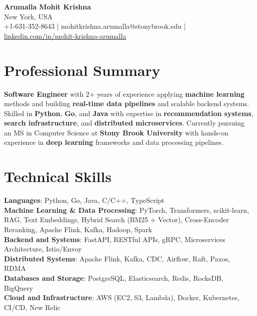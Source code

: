 \documentclass[letterpaper,11pt]{article}
\begin{document}
\begin{center}
  {\Large \textbf{Arumalla Mohit Krishna}} \\
  New York, USA \\
  +1-631-352-8643 \enspace | \enspace mohitkrishna.arumalla@stonybrook.edu \enspace | \enspace \href{https://www.linkedin.com/in/mohit-krishna-arumalla}{linkedin.com/in/mohit-krishna-arumalla}
\end{center}

\section{Professional Summary}
  \begin{itemize}[leftmargin=0.15in, label={}]
    \small{\item{
     \textbf{Software Engineer} with 2+ years of experience applying \textbf{machine learning} methods and building \textbf{real-time data pipelines} and scalable backend systems. Skilled in \textbf{Python}, \textbf{Go}, and \textbf{Java} with expertise in \textbf{recommendation systems}, \textbf{search infrastructure}, and \textbf{distributed microservices}. Currently pursuing an MS in Computer Science at \textbf{Stony Brook University} with hands-on experience in \textbf{deep learning} frameworks and data processing pipelines.
    }}
  \end{itemize}
\vspace{-16pt}

\section{Technical Skills}
 \begin{itemize}[leftmargin=0.15in, label={}]
    \small{\item{
     \textbf{Languages}: Python, Go, Java, C/C++, TypeScript \\
     \textbf{Machine Learning \& Data Processing}: PyTorch, Transformers, scikit-learn, RAG, Text Embeddings, Hybrid Search (BM25 + Vector), Cross-Encoder Reranking, Apache Flink, Kafka, Hadoop, Spark \\
     \textbf{Backend and Systems}: FastAPI, RESTful APIs, gRPC, Microservices Architecture, Istio/Envoy \\
     \textbf{Distributed Systems}: Apache Flink, Kafka, CDC, Airflow, Raft, Paxos, RDMA \\
     \textbf{Databases and Storage}: PostgreSQL, Elasticsearch, Redis, RocksDB, BigQuery \\
     \textbf{Cloud and Infrastructure}: AWS (EC2, S3, Lambda), Docker, Kubernetes, CI/CD, New Relic
    }}
 \end{itemize}
\vspace{-16pt}
\end{document}
